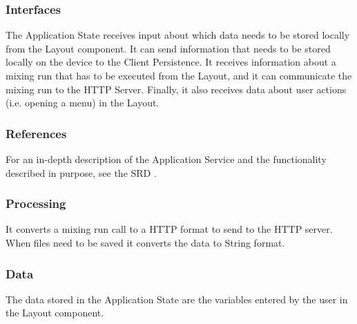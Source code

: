 \subsubsection*{Interfaces}
The Application State receives input about which data needs to be stored locally from the Layout component. It can send information that needs to be stored locally on the device to the Client Persistence. It receives information about a mixing run that has to be executed from the Layout, and it can communicate the mixing run to the HTTP Server. Finally, it also receives data about user actions (i.e. opening a menu) in the Layout.

\subsubsection*{References}
For an in-depth description of the Application Service and the functionality described in purpose, see the SRD \cite{srd}.

\subsubsection*{Processing}
It converts a mixing run call to a HTTP format to send to the HTTP server. When files need to be saved it converts the data to String format.

\subsubsection*{Data}
The data stored in the Application State are the variables entered by the user in the Layout component.
